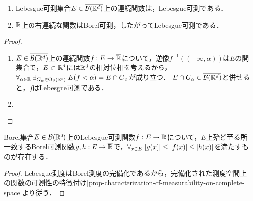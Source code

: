 \documentclass[uplatex, dvipdfmx]{jsreport}
\renewcommand{\B}{\mathcal{B}}
\begin{document}
\begin{proposition}[Lebesgue可測関数と位相]\label{prop-continuous-function-is-Lebesgue-measurable}\mbox{}
    \begin{enumerate}
        \item Lebesgue可測集合$E\in\o{\B(\R^d)}$上の連続関数は，Lebesgue可測である．
        \item $\mathbb{R}$上の右連続な関数はBorel可測，したがってLebesgue可測である．
    \end{enumerate}
\end{proposition}
\begin{proof}\mbox{}
    \begin{enumerate}
        \item $E\in\o{\B(\R^d)}$上の連続関数$f:E\to\overline{\mathbb{R}}$について，逆像$f^{-1}((-\infty,\alpha))$は$E$の開集合で，$E\subset\mathbb{R}^d$には$\mathbb{R}^d$の相対位相を考えるから，
        $\forall_{\alpha\in\mathbb{R}}\;\exists_{G_\alpha\in\mathrm{Op}(\mathbb{R}^d)}\;E(f<\alpha)=E\cap G_\alpha$が成り立つ．
        $E\cap G_\alpha\in\o{\B(\R^d)}$と併せると，$f$はLebesgue可測である．
        \item 

    \end{enumerate}
\end{proof}

\begin{theorem}\label{thm-Lebesgue-measurability-in-terms-of-Borel-measurability}
    Borel集合$E\in\B(\R^d)$上のLebesgue可測関数$f:E\to\overline{\mathbb{R}}$について，$E$上殆ど至る所一致するBorel可測関数$g,h:E\to\overline{\mathbb{R}}$で，$\forall_{x\in E}\;\lvert g(x)\rvert\le\lvert f(x)\rvert\le\lvert h(x)\rvert$を満たすものが存在する．
\end{theorem}
\begin{proof}
    Lebesgue測度はBorel測度の完備化であるから，完備化された測度空間上の関数の可測性の特徴付け\ref{prop-characterization-of-measurability-on-complete-space}より従う．
\end{proof}
\end{document}
